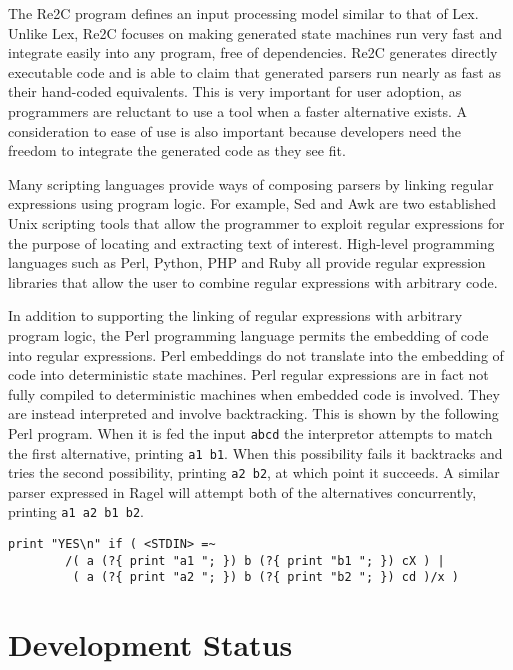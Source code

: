 \documentclass[letterpaper,11pt,oneside]{book}
\newcommand{\verbspace}{\vspace{10pt}}
\begin{document}
The Re2C program defines an input processing model similar to that of Lex.
Unlike Lex, Re2C focuses on making generated state machines run very fast and
integrate easily into any program, free of dependencies.  Re2C generates
directly executable code and is able to claim that generated parsers run nearly
as fast as their hand-coded equivalents.  This is very important for user
adoption, as programmers are reluctant to use a tool when a faster alternative
exists.  A consideration to ease of use is also important because developers
need the freedom to integrate the generated code as they see fit. 

Many scripting languages provide ways of composing parsers by linking regular
expressions using program logic. For example, Sed and Awk are two established
Unix scripting tools that allow the programmer to exploit regular expressions
for the purpose of locating and extracting text of interest. High-level
programming languages such as Perl, Python, PHP and Ruby all provide regular
expression libraries that allow the user to combine regular expressions with
arbitrary code.

In addition to supporting the linking of regular expressions with arbitrary
program logic, the Perl programming language permits the embedding of code into
regular expressions. Perl embeddings do not translate into the embedding of
code into deterministic state machines. Perl regular expressions are in fact
not fully compiled to deterministic machines when embedded code is involved.
They are instead interpreted and involve backtracking. This is shown by the
following Perl program. When it is fed the input \verb|abcd| the interpretor
attempts to match the first alternative, printing \verb|a1 b1|.  When this
possibility fails it backtracks and tries the second possibility, printing
\verb|a2 b2|, at which point it succeeds. A similar parser expressed in Ragel
will attempt both of the alternatives concurrently, printing 
\verb|a1 a2 b1 b2|.

\verbspace
\begin{verbatim}
print "YES\n" if ( <STDIN> =~
        /( a (?{ print "a1 "; }) b (?{ print "b1 "; }) cX ) |
         ( a (?{ print "a2 "; }) b (?{ print "b2 "; }) cd )/x )
\end{verbatim}

\section{Development Status}
\end{document}
